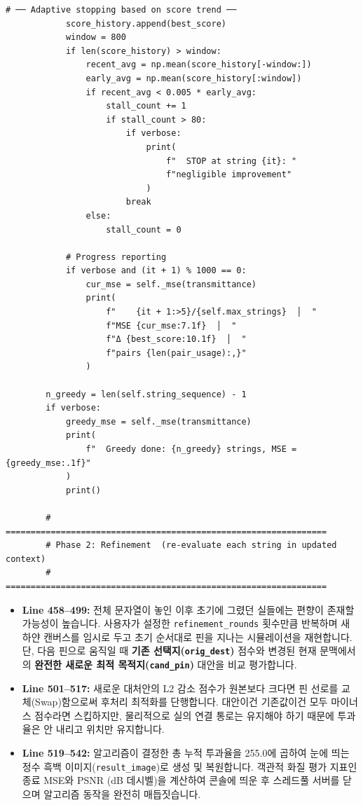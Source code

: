 \begin{lstlisting}[firstnumber=456]
            # ── Adaptive stopping based on score trend ──
            score_history.append(best_score)
            window = 800
            if len(score_history) > window:
                recent_avg = np.mean(score_history[-window:])
                early_avg = np.mean(score_history[:window])
                if recent_avg < 0.005 * early_avg:
                    stall_count += 1
                    if stall_count > 80:
                        if verbose:
                            print(
                                f"  STOP at string {it}: "
                                f"negligible improvement"
                            )
                        break
                else:
                    stall_count = 0

            # Progress reporting
            if verbose and (it + 1) % 1000 == 0:
                cur_mse = self._mse(transmittance)
                print(
                    f"    {it + 1:>5}/{self.max_strings}  │  "
                    f"MSE {cur_mse:7.1f}  │  "
                    f"Δ {best_score:10.1f}  │  "
                    f"pairs {len(pair_usage):,}"
                )

        n_greedy = len(self.string_sequence) - 1
        if verbose:
            greedy_mse = self._mse(transmittance)
            print(
                f"  Greedy done: {n_greedy} strings, MSE = {greedy_mse:.1f}"
            )
            print()

        # ================================================================
        # Phase 2: Refinement  (re-evaluate each string in updated context)
        # ================================================================
\end{lstlisting}
\begin{itemize}
\item \textbf{Line 458--499:} 전체 문자열이 놓인 이후 초기에 그렸던 실들에는 편향이 존재할 가능성이 높습니다. 사용자가 설정한 \texttt{refinement\_rounds} 횟수만큼 반복하며 새 하얀 캔버스를 임시로 두고 초기 순서대로 핀을 지나는 시뮬레이션을 재현합니다. 단, 다음 핀으로 움직일 때 \textbf{기존 선택지(\texttt{orig\_dest})} 점수와 변경된 현재 문맥에서의 \textbf{완전한 새로운 최적 목적지(\texttt{cand\_pin})} 대안을 비교 평가합니다.
\item \textbf{Line 501--517:} 새로운 대처안의 L2 감소 점수가 원본보다 크다면 핀 선로를 교체(Swap)함으로써 후처리 최적화를 단행합니다. 대안이건 기존값이건 모두 마이너스 점수라면 스킵하지만, 물리적으로 실의 연결 통로는 유지해야 하기 때문에 투과율은 안 내리고 위치만 유지합니다.
\item \textbf{Line 519--542:} 알고리즘이 결정한 총 누적 투과율을 255.0에 곱하여 눈에 띄는 정수 흑백 이미지(\texttt{result\_image})로 생성 및 복원합니다. 객관적 화질 평가 지표인 종료 MSE와 PSNR (dB 데시벨)을 계산하여 콘솔에 띄운 후 스레드풀 서버를 닫으며 알고리즘 동작을 완전히 매듭짓습니다.
\end{itemize}

